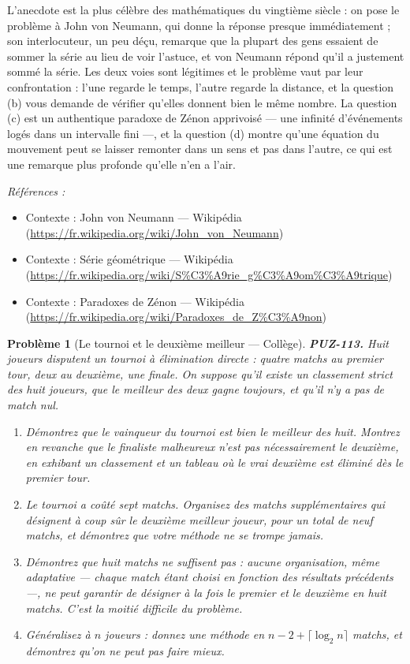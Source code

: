 \documentclass[11pt]{article}
\newtheorem{problem}{Problème}
\newenvironment{refs}{\par\small\noindent\emph{Références :}\begin{itemize}\setlength\itemsep{0pt}}{\end{itemize}\normalsize}
\begin{document}
\noindent L'anecdote est la plus célèbre des mathématiques du vingtième siècle : on
pose le problème à John von Neumann, qui donne la réponse presque immédiatement ; son
interlocuteur, un peu déçu, remarque que la plupart des gens essaient de sommer la série au
lieu de voir l'astuce, et von Neumann répond qu'il a justement sommé la série. Les deux voies
sont légitimes et le problème vaut par leur confrontation : l'une regarde le temps, l'autre
regarde la distance, et la question (b) vous demande de vérifier qu'elles donnent bien le même
nombre. La question (c) est un authentique paradoxe de Zénon apprivoisé --- une infinité
d'événements logés dans un intervalle fini ---, et la question (d) montre qu'une équation du
mouvement peut se laisser remonter dans un sens et pas dans l'autre, ce qui est une remarque
plus profonde qu'elle n'en a l'air.

\begin{refs}
\item Contexte : John von Neumann --- Wikipédia (\url{https://fr.wikipedia.org/wiki/John_von_Neumann})
\item Contexte : Série géométrique --- Wikipédia (\url{https://fr.wikipedia.org/wiki/S%C3%A9rie_g%C3%A9om%C3%A9trique})
\item Contexte : Paradoxes de Zénon --- Wikipédia (\url{https://fr.wikipedia.org/wiki/Paradoxes_de_Z%C3%A9non})
\end{refs}

\bigskip

\begin{problem}[{Le tournoi et le deuxième meilleur --- Collège}]
\textbf{PUZ-113.} Huit joueurs disputent un tournoi à élimination directe : quatre matchs au
premier tour, deux au deuxième, une finale. On suppose qu'il existe un classement strict des
huit joueurs, que le meilleur des deux gagne toujours, et qu'il n'y a pas de match nul.
\begin{enumerate}
\item[(a)] Démontrez que le vainqueur du tournoi est bien le meilleur des huit. Montrez en revanche
que le finaliste malheureux n'est pas nécessairement le deuxième, en exhibant un classement et
un tableau où le vrai deuxième est éliminé dès le premier tour.
\item[(b)] Le tournoi a coûté sept matchs. Organisez des matchs supplémentaires qui désignent à coup
sûr le deuxième meilleur joueur, pour un total de neuf matchs, et démontrez que votre méthode
ne se trompe jamais.
\item[(c)] Démontrez que huit matchs ne suffisent pas : aucune organisation, même adaptative --- chaque
match étant choisi en fonction des résultats précédents ---, ne peut garantir de désigner à la
fois le premier et le deuxième en huit matchs. C'est la moitié difficile du problème.
\item[(d)] Généralisez à $ n $ joueurs : donnez une méthode en $ n - 2 + \lceil \log_2 n \rceil $
matchs, et démontrez qu'on ne peut pas faire mieux.
\end{enumerate}

\end{problem}
\end{document}
